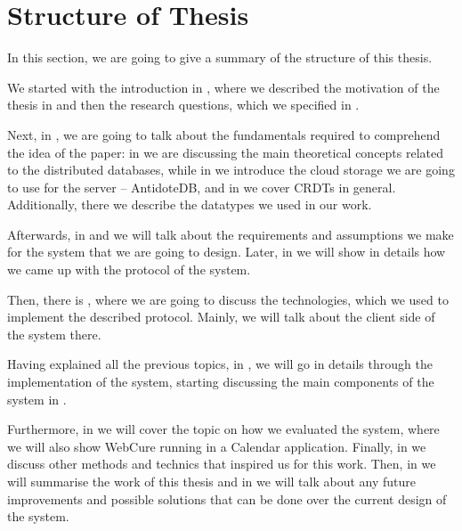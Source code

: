 \section{Structure of Thesis}

In this section, we are going to give a summary of the structure of this thesis. 

We started with the introduction in , where we described the motivation of the thesis in  and then the research questions, which we specified in . 

Next, in , we are going to talk about the fundamentals required to comprehend the idea of the paper: in  we are discussing the main theoretical concepts related to the distributed databases, while in  we introduce the cloud storage we are going to use for the server -- AntidoteDB, and in  we cover CRDTs in general. Additionally, there we describe the datatypes we used in our work. 

Afterwards, in  and  we will talk about the requirements and assumptions we make for the system that we are going to design. Later, in  we will show in details how we came up with the protocol of the system. 

Then, there is , where we are going to discuss the technologies, which we used to implement the described protocol. Mainly, we will talk about the client side of the system there.

Having explained all the previous topics, in , we will go in details through the implementation of the system, starting discussing the main components of the system in .

Furthermore, in  we will cover the topic on how we evaluated the system, where we will also show WebCure running in a Calendar application. Finally, in  we discuss other methods and technics that inspired us for this work. Then, in  we will summarise the work of this thesis and in  we will talk about any future improvements and possible solutions that can be done over the current design of the system. 